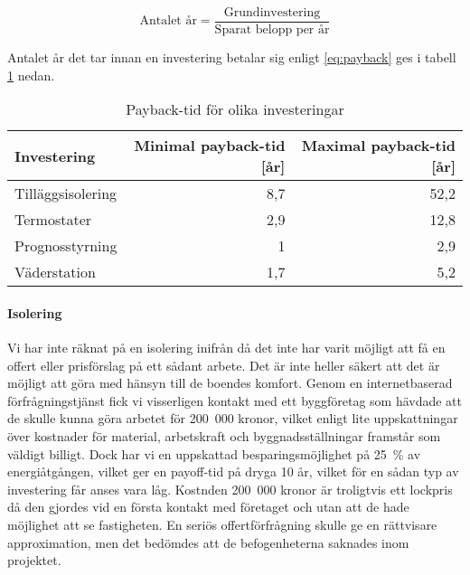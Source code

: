 \begin{equation} \label{eq:payback}
\text{Antalet år}=\frac{\text{Grundinvestering}}{\text{Sparat belopp per år}}
\end{equation}

Antalet år det tar innan en investering betalar sig enligt \eqref{eq:payback} ges i tabell \ref{tbl:payback} nedan.

\begin{table}[hbtp]
\centering
\caption{Payback-tid för olika investeringar}
\label{tbl:payback}

\begin{tabular}
{|l|r|r|}
\hline
\textbf{Investering} & \textbf{Minimal payback-tid [år]} &{\textbf{Maximal payback-tid [år]}} \\
\hline
Tilläggsisolering & 8,7 & 52,2 \\
\hline
Termostater & 2,9 & 12,8 \\
\hline
Prognosstyrning &  1 & 2,9 \\ 
\hline
Väderstation & 1,7 & 5,2 \\
\hline

\end{tabular}
\end{table}

\paragraph{Isolering}
Vi har inte räknat på en isolering inifrån då det inte har varit möjligt att få en offert eller prisförslag på ett sådant arbete. Det är inte heller säkert att det är möjligt att göra med hänsyn till de boendes komfort. Genom en internetbaserad förfrågningstjänst fick vi visserligen kontakt med ett byggföretag som hävdade att de skulle kunna göra arbetet för 200~000 kronor, vilket enligt lite uppskattningar över kostnader för material, arbetskraft och byggnadsställningar framstår som väldigt billigt. Dock har vi en uppskattad besparingsmöjlighet på 25~\% av energiåtgången, vilket ger en payoff-tid på dryga 10 år, vilket för en sådan typ av investering får anses vara låg. Kostnden 200~000 kronor är troligtvis ett lockpris då den gjordes vid en första kontakt med företaget och utan att de hade möjlighet att se fastigheten. En seriös offertförfrågning skulle ge en rättvisare approximation, men det bedömdes att de befogenheterna saknades inom projektet.

